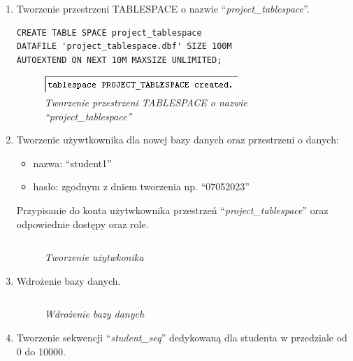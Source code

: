 \documentclass[a4paper, 10pt]{article}
\begin{document}
\begin{enumerate}
	\item Tworzenie przestrzeni TABLESPACE o nazwie ``\emph{project\_tablespace}''.
		\begin{lstlisting}[style=SQL, caption=\textit{Tworzenie przestrzeni TABLESPACE o nazwie ``project\_tablespace''}]
CREATE TABLE SPACE project_tablespace
DATAFILE 'project_tablespace.dbf' SIZE 100M
AUTOEXTEND ON NEXT 10M MAXSIZE UNLIMITED;
		\end{lstlisting}
		\begin{figure}[H]
			\centering
			\includegraphics{zadanie1.png}
			\caption{\textit{Tworzenie przestrzeni TABLESPACE o nazwie ``project\_tablespace''}}
		\end{figure}
	\item Tworzenie używtkownika dla nowej bazy danych oraz przestrzeni o danych:
		\begin{itemize}
			\item nazwa: ``student1''
			\item hasło: zgodnym z dniem tworzenia np. ``07052023''
		\end{itemize}
		Przypisanie do konta użytwkownika przestrzeń ``\emph{project\_tablespace}'' oraz odpowiednie dostępy oraz role.
		\begin{lstlisting}[style=SQL, caption=\textit{Tworzenie użytkownika}]
		\end{lstlisting}
		\begin{figure}[H]
			\centering
			\caption{\textit{Tworzenie użytwkonika}}
		\end{figure}
	\item Wdrożenie bazy danych. 
		\begin{lstlisting}[style=SQL, caption=\textit{Wdrożenie bazy danych}]
		\end{lstlisting}
		\begin{figure}[H]
			\centering
			\caption{\textit{Wdrożenie bazy danych}}
		\end{figure}
	\item Tworzenie sekwencji ``\emph{student\_seq}'' dedykowaną dla studenta w przedziale od 0 do 10000.
		\begin{lstlisting}[style=SQL, caption=\textit{Tworzenie sekwencji ``student\_seq''}]
		\end{lstlisting}
		\begin{figure}[H]

\end{figure}
\end{enumerate}
\end{document}
